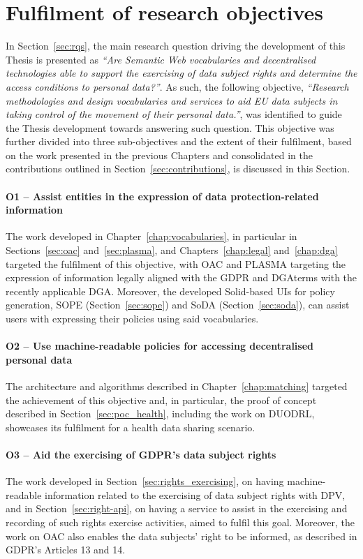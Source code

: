 \section{Fulfilment of research objectives}
\label{sec:fulfilment}

In Section~\ref{sec:rqs}, the main research question driving the development of this Thesis is presented as 
\textit{``Are Semantic Web vocabularies and decentralised technologies able to support the exercising of data subject rights and determine the access conditions to personal data?''}.
As such, the following objective,
\textit{``Research methodologies and design vocabularies and services to aid EU data subjects in taking control of the movement of their personal data.''},
was identified to guide the Thesis development towards answering such question.
This objective was further divided into three sub-objectives and the extent of their fulfilment, based on the work presented in the previous Chapters and consolidated in the contributions outlined in Section~\ref{sec:contributions}, is discussed in this Section.

\paragraph{O1 -- Assist entities in the expression of data protection-related information} The work developed in Chapter~\ref{chap:vocabularies}, in particular in Sections~\ref{sec:oac} and~\ref{sec:plasma}, and Chapters~\ref{chap:legal} and~\ref{chap:dga} targeted the fulfilment of this objective, with OAC and PLASMA targeting the expression of information legally aligned with the GDPR and DGAterms with the recently applicable DGA. Moreover, the developed Solid-based UIs for policy generation, SOPE (Section~\ref{sec:sope}) and SoDA (Section~\ref{sec:soda}), can assist users with expressing their policies using said vocabularies.

\paragraph{O2 -- Use machine-readable policies for accessing decentralised personal data} The architecture and algorithms described in Chapter~\ref{chap:matching} targeted the achievement of this objective and, in particular, the proof of concept described in Section~\ref{sec:poc_health}, including the work on DUODRL, showcases its fulfilment for a health data sharing scenario.

\paragraph{O3 -- Aid the exercising of GDPR’s data subject rights} The work developed in Section~\ref{sec:rights_exercising}, on having machine-readable information related to the exercising of data subject rights with DPV, and in Section~\ref{sec:right-api}, on having a service to assist in the exercising and recording of such rights exercise activities, aimed to fulfil this goal. Moreover, the work on OAC also enables the data subjects' right to be informed, as described in GDPR's Articles 13 and 14.

